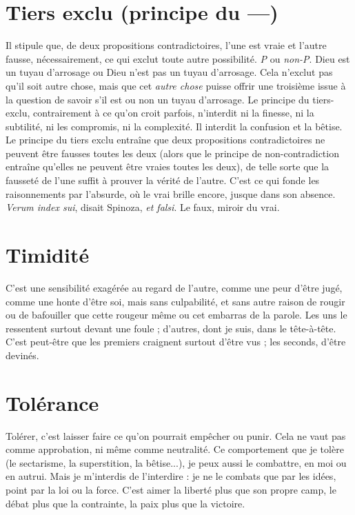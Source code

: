\section{Tiers exclu (principe du —)}
Il stipule que, de deux propositions contradictoires,
l’une est vraie et l’autre fausse,
nécessairement, ce qui exclut toute autre possibilité. {\it P} ou {\it non-P}. Dieu est un
tuyau d’arrosage ou Dieu n’est pas un tuyau d’arrosage. Cela n’exclut pas qu’il
soit autre chose, mais que cet {\it autre chose} puisse offrir une troisième issue à la
question de savoir s’il est ou non un tuyau d’arrosage. Le principe du tiers-exclu,
contrairement à ce qu’on croit parfois, n’interdit ni la finesse, ni la subtilité,
ni les compromis, ni la complexité. Il interdit la confusion et la bêtise.
Le principe du tiers exclu entraîne que deux propositions contradictoires ne
peuvent être fausses toutes les deux (alors que le principe de non-contradiction
entraîne qu'elles ne peuvent être vraies toutes les deux), de telle sorte que la
fausseté de l’une suffit à prouver la vérité de l’autre. C’est ce qui fonde les raisonnements
par l'absurde, où le vrai brille encore, jusque dans son absence.
{\it Verum index sui}, disait Spinoza, {\it et falsi}. Le faux, miroir du vrai.

\section{Timidité}
C’est une sensibilité exagérée au regard de l’autre, comme une
peur d’être jugé, comme une honte d’être soi, mais sans culpabilité,
et sans autre raison de rougir ou de bafouiller que cette rougeur même ou
cet embarras de la parole. Les uns le ressentent surtout devant une foule ;
d’autres, dont je suis, dans le tête-à-tête. C’est peut-être que les premiers craignent
surtout d’être vus ; les seconds, d’être devinés.

\section{Tolérance}
Tolérer, c’est laisser faire ce qu’on pourrait empêcher ou
punir. Cela ne vaut pas comme approbation, ni même
comme neutralité. Ce comportement que je tolère (le sectarisme, la superstition,
la bêtise...), je peux aussi le combattre, en moi ou en autrui. Mais je
m'interdis de l’interdire : je ne le combats que par les idées, point par la loi ou
la force. C’est aimer la liberté plus que son propre camp, le débat plus que la
contrainte, la paix plus que la victoire.

